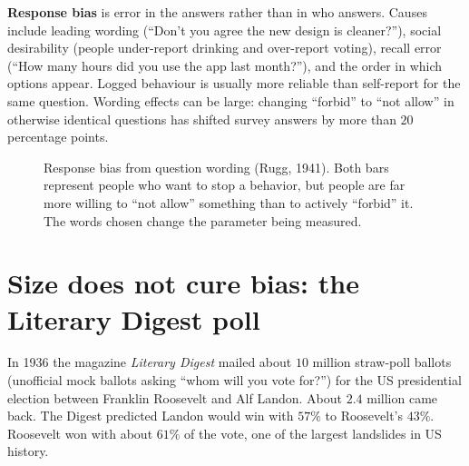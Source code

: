 \textbf{Response bias} is error in the answers rather than in who answers. Causes include
leading wording (``Don't you agree the new design is cleaner?''), social desirability
(people under-report drinking and over-report voting), recall error (``How many hours did
you use the app last month?''), and the order in which options appear. Logged behaviour
is usually more reliable than self-report for the same question. Wording effects can be
large: changing ``forbid'' to ``not allow'' in otherwise identical questions has shifted
survey answers by more than $20$ percentage points.

\begin{figure}[H]
\centering
{}
\caption{Response bias from question wording (Rugg, 1941). Both bars represent people who want to stop a behavior, but people are far more willing to ``not allow'' something than to actively ``forbid'' it. The words chosen change the parameter being measured.}
\label{fig:sampling-wording}
\end{figure}

\section{Size does not cure bias: the Literary Digest poll}
\label{sec:sampling-digest}

In 1936 the magazine \emph{Literary Digest} mailed about $10$ million straw-poll ballots
(unofficial mock ballots asking ``whom will you vote for?'')
for the US presidential election between Franklin Roosevelt and Alf Landon. About
$2.4$ million came back. The Digest predicted Landon would win with $57\%$ to Roosevelt's
$43\%$. Roosevelt won with about $61\%$ of the vote, one of the largest landslides in US
history.

